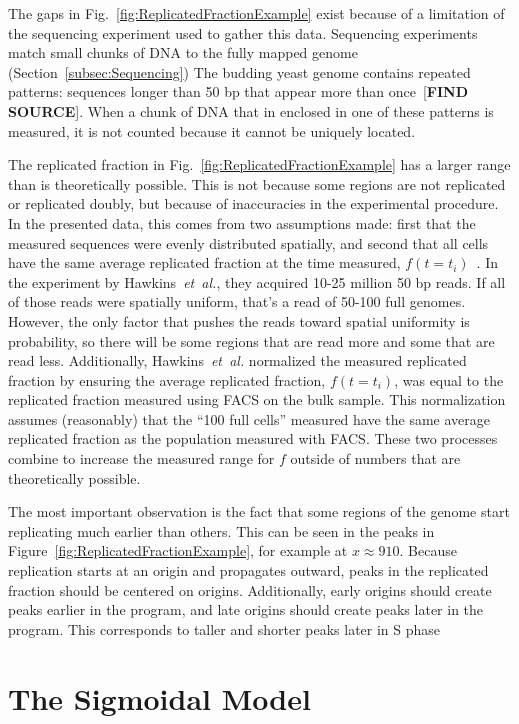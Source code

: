 		The gaps in Fig.~\ref{fig:ReplicatedFractionExample} exist because of a limitation of the sequencing experiment used to gather this data.
		Sequencing experiments match small chunks of DNA to the fully mapped genome (Section~\ref{subsec:Sequencing})
		The budding yeast genome contains repeated patterns: sequences longer than 50 bp that appear more than once~[\textbf{FIND SOURCE}].
		When a chunk of DNA that in enclosed in one of these patterns is measured, it is not counted because it cannot be uniquely located.
		
		The replicated fraction in Fig.~\ref{fig:ReplicatedFractionExample} has a larger range than is theoretically possible.
		This is not because some regions are not replicated or replicated doubly, but because of inaccuracies in the experimental procedure.
		In the presented data, this comes from two assumptions made: first that the measured sequences were evenly distributed spatially, and second that all cells have the same average replicated fraction at the time measured, $f(t=t_i)$~\cite{StochasticTermination}.
		In the experiment by Hawkins~\emph{et~al.}, they acquired 10-25 million 50 bp reads.
		If all of those reads were spatially uniform, that's a read of 50-100 full genomes.
		However, the only factor that pushes the reads toward spatial uniformity is probability, so there will be some regions that are read more and some that are read less.
		Additionally, Hawkins~\emph{et~al.} normalized the measured replicated fraction by ensuring the average replicated fraction, $f(t=t_i)$, was equal to the replicated fraction measured using FACS on the bulk sample.
		This normalization assumes (reasonably) that the ``100 full cells'' measured have the same average replicated fraction as the population measured with FACS.
		These two processes combine to increase the measured range for $f$ outside of numbers that are theoretically possible.
		
		The most important observation is the fact that some regions of the genome start replicating much earlier than others.
		This can be seen in the peaks in Figure~\ref{fig:ReplicatedFractionExample}, for example at $x \approx 910$.
		Because replication starts at an origin and propagates outward, peaks in the replicated fraction should be centered on origins.
		Additionally, early origins should create peaks earlier in the program, and late origins should create peaks later in the program.
		This corresponds to taller and shorter peaks later in S phase

	\section{The Sigmoidal Model}
	\label{sec:SigmoidalModel}
	

